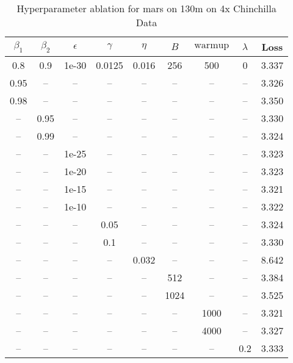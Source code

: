 \begin{table}[h!]
\centering
\caption{Hyperparameter ablation for mars on 130m on 4x Chinchilla Data}
\label{tab:ablation_mars_130m_on_4x_chinchilla_data}
\begin{tabular}{ccccccccc}
\toprule
$\beta_1$ & $\beta_2$ & $\epsilon$ & $\gamma$ & $\eta$ & $B$ & $\mathrm{warmup}$ & $\lambda$ & Loss \\
\midrule
0.8 & 0.9 & 1e-30 & 0.0125 & 0.016 & 256 & 500 & 0 & 3.337 \\
\midrule
0.95 & -- & -- & -- & -- & -- & -- & -- & 3.326 \\
0.98 & -- & -- & -- & -- & -- & -- & -- & 3.350 \\
-- & 0.95 & -- & -- & -- & -- & -- & -- & 3.330 \\
-- & 0.99 & -- & -- & -- & -- & -- & -- & 3.324 \\
-- & -- & 1e-25 & -- & -- & -- & -- & -- & 3.323 \\
-- & -- & 1e-20 & -- & -- & -- & -- & -- & 3.323 \\
-- & -- & 1e-15 & -- & -- & -- & -- & -- & 3.321 \\
-- & -- & 1e-10 & -- & -- & -- & -- & -- & 3.322 \\
-- & -- & -- & 0.05 & -- & -- & -- & -- & 3.324 \\
-- & -- & -- & 0.1 & -- & -- & -- & -- & 3.330 \\
-- & -- & -- & -- & 0.032 & -- & -- & -- & 8.642 \\
-- & -- & -- & -- & -- & 512 & -- & -- & 3.384 \\
-- & -- & -- & -- & -- & 1024 & -- & -- & 3.525 \\
-- & -- & -- & -- & -- & -- & 1000 & -- & 3.321 \\
-- & -- & -- & -- & -- & -- & 4000 & -- & 3.327 \\
-- & -- & -- & -- & -- & -- & -- & 0.2 & 3.333 \\
\bottomrule
\end{tabular}
\end{table}


